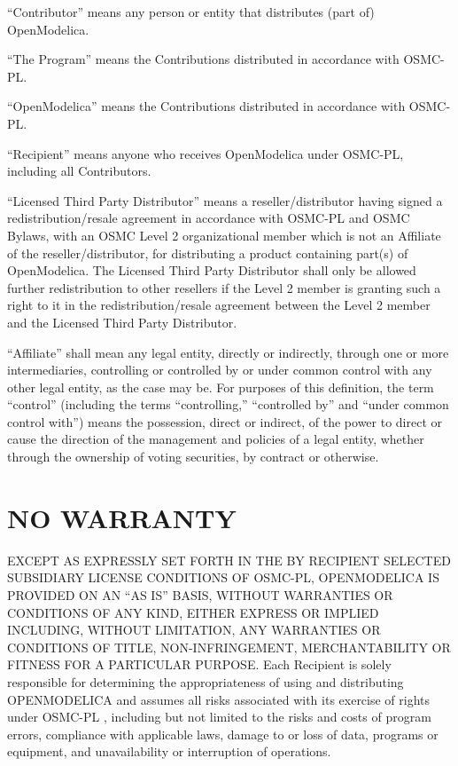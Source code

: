\documentclass[a4paper, 12pt]{article}
\begin{document}
\vspace{0.5cm}

``Contributor'' means any person or entity that distributes (part of) OpenModelica.

\vspace{0.5cm}

``The Program'' means the Contributions distributed in accordance with OSMC-PL.

\vspace{0.5cm}

``OpenModelica'' means the Contributions distributed in accordance with OSMC-PL.

\vspace{0.5cm}

``Recipient'' means anyone who receives OpenModelica under OSMC-PL, including all Contributors.

\vspace{0.5cm}

``Licensed Third Party Distributor'' means a reseller/distributor having signed a redistribution/resale agreement in accordance with OSMC-PL and OSMC Bylaws, with an OSMC Level 2 organizational member which is not an Affiliate of the reseller/distributor, for distributing a product containing part(s) of OpenModelica. The Licensed Third Party Distributor shall only be allowed further redistribution to other resellers if the Level 2 member is granting such a right to it in the redistribution/resale agreement between the Level 2 member and the Licensed Third Party Distributor.

\vspace{0.5cm}

``Affiliate'' shall mean any legal entity, directly or indirectly, through one or more intermediaries, controlling or controlled by or under common control with any other legal entity, as the case may be. For purposes of this definition, the term ``control'' (including the terms ``controlling,'' ``controlled by'' and ``under common control with'') means the possession, direct or indirect, of the power to direct or cause the direction of the management and policies of a legal entity, whether through the ownership of voting securities, by contract or otherwise.

\section*{NO WARRANTY}

EXCEPT AS EXPRESSLY SET FORTH IN THE BY RECIPIENT SELECTED SUBSIDIARY LICENSE CONDITIONS OF OSMC-PL, OPENMODELICA IS PROVIDED ON AN ``AS IS'' BASIS, WITHOUT WARRANTIES OR CONDITIONS OF ANY KIND, EITHER EXPRESS OR IMPLIED INCLUDING, WITHOUT LIMITATION, ANY WARRANTIES OR CONDITIONS OF TITLE, NON-INFRINGEMENT, MERCHANTABILITY OR FITNESS FOR A PARTICULAR PURPOSE. Each Recipient is solely responsible for determining the appropriateness of using and distributing OPENMODELICA and assumes all risks associated with its exercise of rights under OSMC-PL , including but not limited to the risks and costs of program errors, compliance with applicable laws, damage to or loss of data, programs or equipment, and unavailability or interruption of operations.
\end{document}
